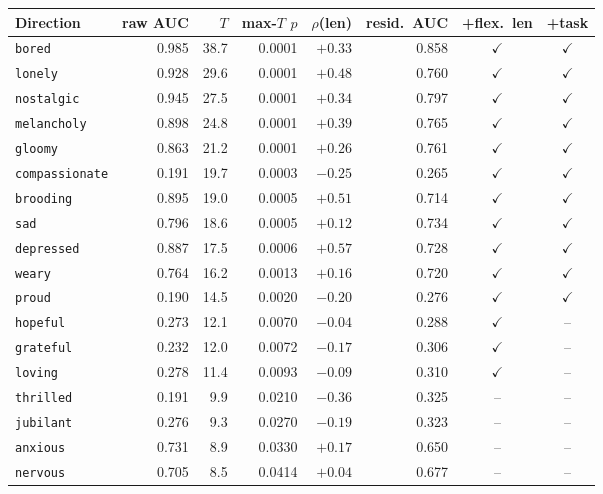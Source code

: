 \begin{table}[h]
\centering\scriptsize\setlength{\tabcolsep}{5pt}
\begin{tabular}{@{}lrrrrrcc@{}}
\toprule
Direction & raw AUC & $T$ & max-$T$ $p$ & $\rho$(len) & resid.\ AUC & +flex.\ len & +task \\
\midrule
\texttt{bored} & 0.985 & 38.7 & 0.0001 & $+0.33$ & 0.858 & $\checkmark$ & $\checkmark$ \\
\texttt{lonely} & 0.928 & 29.6 & 0.0001 & $+0.48$ & 0.760 & $\checkmark$ & $\checkmark$ \\
\texttt{nostalgic} & 0.945 & 27.5 & 0.0001 & $+0.34$ & 0.797 & $\checkmark$ & $\checkmark$ \\
\texttt{melancholy} & 0.898 & 24.8 & 0.0001 & $+0.39$ & 0.765 & $\checkmark$ & $\checkmark$ \\
\texttt{gloomy} & 0.863 & 21.2 & 0.0001 & $+0.26$ & 0.761 & $\checkmark$ & $\checkmark$ \\
\texttt{compassionate} & 0.191 & 19.7 & 0.0003 & $-0.25$ & 0.265 & $\checkmark$ & $\checkmark$ \\
\texttt{brooding} & 0.895 & 19.0 & 0.0005 & $+0.51$ & 0.714 & $\checkmark$ & $\checkmark$ \\
\texttt{sad} & 0.796 & 18.6 & 0.0005 & $+0.12$ & 0.734 & $\checkmark$ & $\checkmark$ \\
\texttt{depressed} & 0.887 & 17.5 & 0.0006 & $+0.57$ & 0.728 & $\checkmark$ & $\checkmark$ \\
\texttt{weary} & 0.764 & 16.2 & 0.0013 & $+0.16$ & 0.720 & $\checkmark$ & $\checkmark$ \\
\texttt{proud} & 0.190 & 14.5 & 0.0020 & $-0.20$ & 0.276 & $\checkmark$ & $\checkmark$ \\
\texttt{hopeful} & 0.273 & 12.1 & 0.0070 & $-0.04$ & 0.288 & $\checkmark$ & -- \\
\texttt{grateful} & 0.232 & 12.0 & 0.0072 & $-0.17$ & 0.306 & $\checkmark$ & -- \\
\texttt{loving} & 0.278 & 11.4 & 0.0093 & $-0.09$ & 0.310 & $\checkmark$ & -- \\
\texttt{thrilled} & 0.191 & 9.9 & 0.0210 & $-0.36$ & 0.325 & -- & -- \\
\texttt{jubilant} & 0.276 & 9.3 & 0.0270 & $-0.19$ & 0.323 & -- & -- \\
\texttt{anxious} & 0.731 & 8.9 & 0.0330 & $+0.17$ & 0.650 & -- & -- \\
\texttt{nervous} & 0.705 & 8.5 & 0.0414 & $+0.04$ & 0.677 & -- & -- \\
\midrule

\end{tabular}
\end{table}
